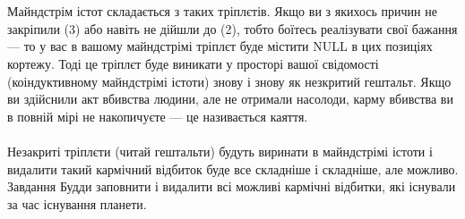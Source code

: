 \\
\\
Майндстрім істот складається з таких тріплєтів. Якщо ви з якихось причин не закріпили (3) або навіть не дійшли до (2),
тобто боїтесь реалізувати свої бажання --- то у вас в вашому майндстрімі тріплєт буде містити NULL в цих позиціях кортежу.
Тоді це тріплєт буде виникати у просторі вашої свідомості (коіндуктивному майндстрімі істоти) знову і знову як незкритий гештальт.
Якщо ви здійснили акт вбивства людини, але не отримали насолоди, карму вбивства ви в повній мірі не накопичуєте --- це називається каяття.
\\
\\
Незакриті тріплєти (читай гештальти) будуть виринати в майндстрімі істоти і видалити такий
кармічний відбиток буде все складніше і складніше, але можливо. Завдання Будди заповнити і видалити
всі можливі кармічні відбитки, які існували за час існування планети.

